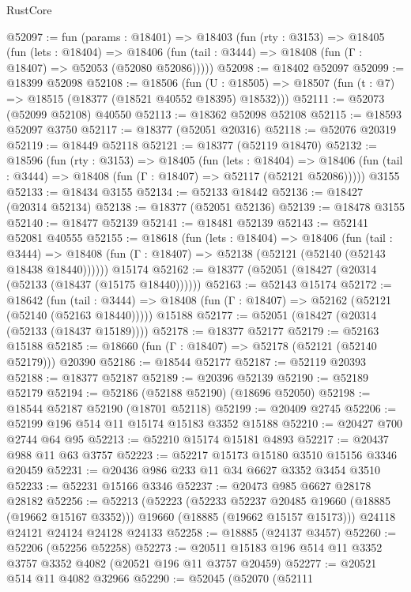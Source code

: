 \begin{lexlean}{RustCore}
\begin{coremodule}
@52097 := fun (params : @18401) =>
  @18403
    (fun (rty : @3153) =>
    @18405
      (fun (lets : @18404) =>
      @18406 (fun (tail : @3444) => @18408 (fun (Γ : @18407) => @52053 (@52080 @52086)))))
@52098 := @18402 @52097
@52099 := @18399 @52098
@52108 := @18506
    (fun (U : @18505) => @18507 (fun (t : @7) => @18515 (@18377 (@18521 @40552 @18395) @18532)))
@52111 := @52073 (@52099 @52108) @40550
@52113 := @18362 @52098 @52108
@52115 := @18593 @52097 @3750
@52117 := @18377 (@52051 @20316)
@52118 := @52076 @20319
@52119 := @18449 @52118
@52121 := @18377 (@52119 @18470)
@52132 := @18596
    (fun (rty : @3153) =>
    @18405
      (fun (lets : @18404) =>
      @18406 (fun (tail : @3444) => @18408 (fun (Γ : @18407) => @52117 (@52121 @52086)))))
    @3155
@52133 := @18434 @3155
@52134 := @52133 @18442
@52136 := @18427 (@20314 @52134)
@52138 := @18377 (@52051 @52136)
@52139 := @18478 @3155
@52140 := @18477 @52139
@52141 := @18481 @52139
@52143 := @52141 @52081 @40555
@52155 := @18618
    (fun (lets : @18404) =>
    @18406
      (fun (tail : @3444) =>
      @18408 (fun (Γ : @18407) => @52138 (@52121 (@52140 (@52143 @18438 @18440))))))
    @15174
@52162 := @18377 (@52051 (@18427 (@20314 (@52133 (@18437 (@15175 @18440))))))
@52163 := @52143 @15174
@52172 := @18642
    (fun (tail : @3444) => @18408 (fun (Γ : @18407) => @52162 (@52121 (@52140 (@52163 @18440)))))
    @15188
@52177 := @52051 (@18427 (@20314 (@52133 (@18437 @15189))))
@52178 := @18377 @52177
@52179 := @52163 @15188
@52185 := @18660 (fun (Γ : @18407) => @52178 (@52121 (@52140 @52179))) @20390
@52186 := @18544 @52177
@52187 := @52119 @20393
@52188 := @18377 @52187
@52189 := @20396 @52139
@52190 := @52189 @52179
@52194 := @52186 (@52188 @52190) (@18696 @52050)
@52198 := @18544 @52187 @52190 (@18701 @52118)
@52199 := @20409 @2745
@52206 := @52199 @196 @514 @11 @15174 @15183 @3352 @15188
@52210 := @20427 @700 @2744 @64 @95
@52213 := @52210 @15174 @15181 @4893
@52217 := @20437 @988 @11 @63 @3757
@52223 := @52217 @15173 @15180 @3510 @15156 @3346 @20459
@52231 := @20436 @986 @233 @11 @34 @6627 @3352 @3454 @3510
@52233 := @52231 @15166 @3346
@52237 := @20473 @985 @6627 @28178 @28182
@52256 := @52213
    (@52223
      (@52233 @52237 @20485 @19660 (@18885 (@19662 @15167 @3352)))
      @19660
      (@18885 (@19662 @15157 @15173)))
    @24118
    @24121
    @24124
    @24128
    @24133
@52258 := @18885 (@24137 @3457)
@52260 := @52206 (@52256 @52258)
@52273 := @20511 @15183 @196 @514 @11 @3352 @3757 @3352 @4082 (@20521 @196 @11 @3757 @20459)
@52277 := @20521 @514 @11 @4082 @32966
@52290 := @52045
    (@52070
      (@52111

\end{coremodule}
\end{lexlean}
